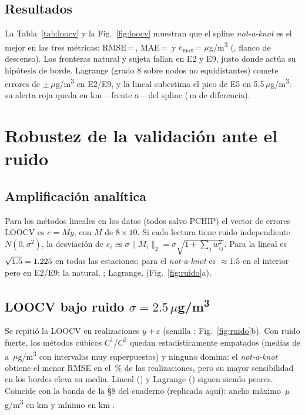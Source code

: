 \documentclass[conference,a4paper]{IEEEtran}
\newcommand{\ugm}{\ensuremath{\mu}g/m\textsuperscript{3}}
\newcommand{\nak}{\emph{not-a-knot}}
\begin{document}
\subsection{Resultados}
La Tabla~\ref{tab:loocv} y la Fig.~\ref{fig:loocv} muestran que el spline \nak{} es el mejor en las tres
métricas: RMSE\,=\,\RMSEnak, MAE\,=\,\MAEnak{} y $e_{\max}$\,=\,\EMAXnak\,\ugm{} (\PEORnak, flanco de
descenso). Las fronteras natural y sujeta fallan en E2 y E9, justo donde actúa su hipótesis de borde.
Lagrange (grado 8 sobre nodos no equidistantes) comete errores de $\pm$\EMAXlag\,\ugm{} en E2/E9, y la lineal
subestima el pico de E5 en 5.5\,\ugm: su alerta roja queda en km \ROlinDesde--\ROlinHasta{} frente a
\ROdesde--\ROhasta{} del spline (\DESFASElin\,m de diferencia).

\section{Robustez de la validación ante el ruido}
\subsection{Amplificación analítica}
Para los métodos lineales en los datos (todos salvo PCHIP) el vector de errores LOOCV es $e=My$, con $M$ de
$8\times10$. Si cada lectura tiene ruido independiente $N(0,\sigma^2)$, la desviación de $e_i$ es
$\sigma\|M_i\|_2=\sigma\sqrt{1+\sum_jw_{ij}^2}$. Para la lineal es $\sqrt{1.5}=1.225$ en todas las
estaciones; para el \nak{} es $\approx1.5$ en el interior pero \FACnakBorde{} en E2/E9; la natural,
\FACnatBorde; Lagrange, \FAClagBorde{} (Fig.~\ref{fig:ruido}a).

\subsection{\texorpdfstring{LOOCV bajo ruido $\sigma=2.5$\,\ugm}{LOOCV bajo ruido sigma = 2.5}}
Se repitió la LOOCV en \NMC{} realizaciones $y+\varepsilon$ (semilla \SEMILLA;
Fig.~\ref{fig:ruido}b). Con ruido fuerte, los métodos cúbicos $C^1$/$C^2$ quedan estadísticamente empatados
(medias de \MCnat{} a \MCnak\,\ugm{} con intervalos muy superpuestos) y ninguno domina: el \nak{} obtiene el
menor RMSE en el \MCganaNak\,\% de las realizaciones, pero su mayor sensibilidad en los bordes eleva su media. Lineal (\MClin) y Lagrange
(\MClag) siguen siendo peores. Coincide con la banda de la §8 del cuaderno (replicada aquí): ancho máximo
\BANDAmax\,\ugm{} en km \BANDAmaxkm{} y mínimo \BANDAmin{} en km \BANDAminkm.
\end{document}
